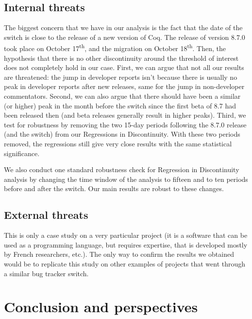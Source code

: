 \documentclass[runningheads]{llncs}
\begin{document}
\subsection{Internal threats}

The biggest concern that we have in our analysis is the fact that the date of the switch is close to the release of a new version of Coq. The release of version 8.7.0 took place on October 17\textsuperscript{th}, and the migration on October 18\textsuperscript{th}. Then, the hypothesis that there is no other discontinuity around the threshold of interest does not completely hold in our case. First, we can argue that not all our results are threatened: the jump in developer reports isn't because there is usually no peak in developer reports after new releases, same for the jump in non-developer commentators. Second, we can also argue that there should have been a similar (or higher) peak in the month before the switch since the first beta of 8.7 had been released then (and beta releases generally result in higher peaks). Third, we test for robustness by removing the two 15-day periods following the 8.7.0 release (and the switch) from our Regressions in Discontinuity. With these two periods removed, the regressions still give very close results with the same statistical significance.

We also conduct one standard robustness check for Regression in Discontinuity analysis by changing the time window of the analysis to fifteen and to ten periods before and after the switch. Our main results are robust to these changes.

\subsection{External threats}

This is only a case study on a very particular project (it is a software that can be used as a programming language, but requires expertise, that is developed mostly by French researchers, etc.). The only way to confirm the results we obtained would be to replicate this study on other examples of projects that went through a similar bug tracker switch.

\section{Conclusion and perspectives}
\end{document}
